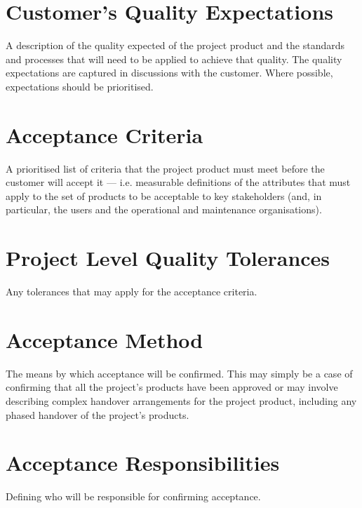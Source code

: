 \documentclass{report}
\begin{document}
\section{Customer's Quality Expectations}
A description of the quality expected of the project product and the standards and processes that will need to be applied to achieve that quality. The quality expectations are captured in discussions with the customer. Where possible, expectations should be prioritised.

\section{Acceptance Criteria}
A prioritised list of criteria that the project product must meet before the customer will accept it --- i.e. measurable definitions of the attributes that must apply to the set of products to be acceptable to key stakeholders (and, in particular, the users and the operational and maintenance organisations).

\section{Project Level Quality Tolerances}
Any tolerances that may apply for the acceptance criteria.

\section{Acceptance Method}
The means by which acceptance will be confirmed. This may simply be a case of confirming that all the project's products have been approved or may involve describing complex handover arrangements for the project product, including any phased handover of the project's products.

\section{Acceptance Responsibilities}
Defining who will be responsible for confirming acceptance.
\end{document}
